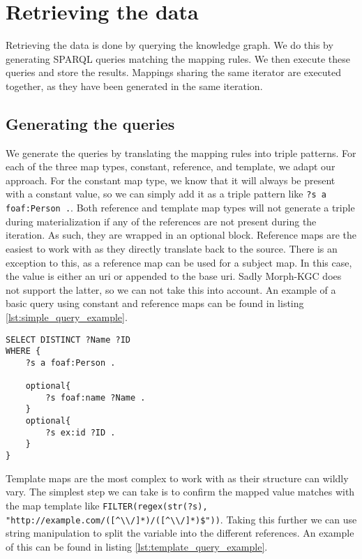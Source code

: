 \section{Retrieving the data}
\label{section:retrieving_data}
Retrieving the data is done by querying the knowledge graph. We do this by generating SPARQL queries matching the mapping rules. We then execute these queries and store the results. Mappings sharing the same iterator are executed together, as they have been generated in the same iteration. 

\subsection{Generating the queries}
\label{subsection:generating_queries}
We generate the queries by translating the mapping rules into triple patterns. 
For each of the three map types, constant, reference, and template, we adapt our approach. 
For the constant map type, we know that it will always be present with a constant value, so we can simply add it as a triple pattern like \texttt{?s a foaf:Person .}. 
Both reference and template map types will not generate a triple during materialization if any of the references are not present during the iteration. As such, they are wrapped in an optional block. 
Reference maps are the easiest to work with as they directly translate back to the source. There is an exception to this, as a reference map can be used for a subject map. In this case, the value is either an \acrshort{uri} or appended to the base \acrshort{uri}. Sadly Morph-KGC does not support the latter, so we can not take this into account. An example of a basic query using constant and reference maps can be found in listing \ref{lst:simple_query_example}.

\begin{lstlisting}[caption={Simple query example}, label={lst:simple_query_example}, captionpos=b]
SELECT DISTINCT ?Name ?ID
WHERE {
    ?s a foaf:Person .

    optional{
        ?s foaf:name ?Name .
    }
    optional{
        ?s ex:id ?ID .
    }
}
\end{lstlisting}    

Template maps are the most complex to work with as their structure can wildly vary. The simplest step we can take is to confirm the mapped value matches with the map template like \break
\texttt{FILTER(regex(str(?s), "http://example.com/([\textasciicircum\textbackslash\textbackslash/]*)/([\textasciicircum\textbackslash\textbackslash/]*)\$"))}. Taking this further we can use string manipulation to split the variable into the different references. An example of this can be found in listing \ref{lst:template_query_example}.

